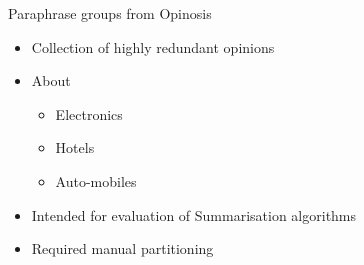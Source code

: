\documentclass[12pt,landscape,english]{beamer}
\begin{document}
\begin{frame}{Paraphrase groups from Opinosis}
	\begin{itemize}
		\item Collection of highly redundant opinions
		\item About \begin{itemize}
			\item Electronics
			\item Hotels
			\item Auto-mobiles
		\end{itemize}
		
		\item Intended for evaluation of Summarisation algorithms
		\item Required manual partitioning
	\end{itemize}
\end{frame}
\end{document}
